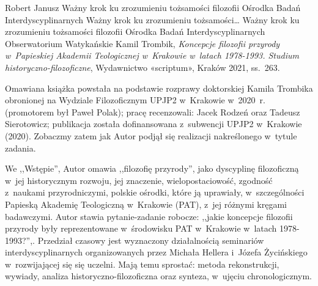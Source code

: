 \begin{newrevplenv}{Robert Janusz}
	{Ważny krok ku zrozumieniu tożsamości filozofii Ośrodka Badań Interdyscyplinarnych}
	{Ważny krok ku zrozumieniu tożsamości\ldots}
	{Ważny krok ku zrozumieniu tożsamości filozofii Ośrodka Badań Interdyscyplinarnych}
	{Obserwatorium Watykańskie}
	{Kamil Trombik, \textit{Koncepcje filozofii przyrody w~Papieskiej Akademii Teologicznej w~Krakowie w~latach 1978-1993. Studium historyczno-filozoficzne}, Wydawnictwo «scriptum», Kraków 2021, ss.~263.}

\lettrine[loversize=0.13,lines=2,lraise=-0.03,nindent=0em,findent=0.2pt]%
{O}{}mawiana książka powstała na podstawie rozprawy doktorskiej Kamila Trombika obronionej na Wydziale Filozoficznym UPJP2 w~Krakowie w~2020~r. (promotorem był Paweł Polak); pracę recenzowali: Jacek Rodzeń oraz Tadeusz Sierotowicz; publikacja została dofinansowana z~subwencji UPJP2 w~Krakowie (2020).
Zobaczmy zatem jak Autor podjął się realizacji nakreślonego w~tytule zadania.

We ,,Wstępie'', Autor omawia ,,filozofię przyrody'', jako dyscyplinę filozoficzną w~jej historycznym rozwoju, jej znaczenie, wielopostaciowość, zgodność z~naukami przyrodniczymi, polskie ośrodki, które ją uprawiały, w~szczególności Papieską Akademię Teologiczną w~Krakowie (PAT), z~jej różnymi kręgami badawczymi. Autor stawia pytanie-zadanie robocze: ,,jakie koncepcje filozofii przyrody były reprezentowane w~środowisku PAT w~Krakowie w~latach 1978-1993?'',. Przedział czasowy jest wyznaczony działalnością seminariów interdyscyplinarnych organizowanych przez Michała Hellera i~Józefa Życińskiego w~rozwijającej się się uczelni. Mają temu sprostać: metoda rekonstrukcji, wywiady, analiza historyczno-filozoficzna oraz synteza, w~ujęciu chronologicznym.


\end{newrevplenv}
